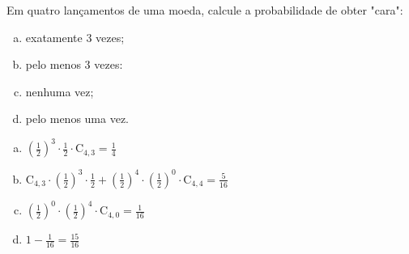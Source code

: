 \begin{ex}
 Em quatro lançamentos de uma moeda, calcule a probabilidade de obter "cara":
    \begin{enumerate}[(a)]
    \item exatamente 3 vezes;
    \item pelo menos 3 vezes:
    \item nenhuma vez;
    \item pelo menos uma vez.
    \end{enumerate}
      \begin{sol}
      \phantom{A}
        \begin{enumerate} [(a)]
            \item $(\frac{1}{2})^3\cdot\frac{1}{2}\cdot \mathrm{C}_{4,3}=\frac{1}{4}$ 
            \item $\mathrm{C}_{4,3}\cdot(\frac{1}{2})^3\cdot\frac{1}{2}+(\frac{1}{2})^4\cdot(\frac{1}{2})^0\cdot \mathrm{C}_{4,4}=\frac{5}{16}$
            \item
            $(\frac{1}{2})^0\cdot(\frac{1}{2})^4\cdot\mathrm{C}_{4,0}=\frac{1}{16}$
            \item $1-\frac{1}{16}=\frac{15}{16}$
        \end{enumerate}
      \end{sol}
\end{ex}